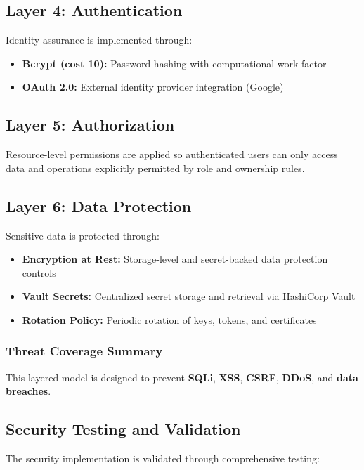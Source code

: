 \documentclass[11pt,a4paper]{report}
\begin{document}
\subsection{Layer 4: Authentication}

Identity assurance is implemented through:
\begin{itemize}
  \item \textbf{Bcrypt (cost 10):} Password hashing with computational work factor
  \item \textbf{OAuth 2.0:} External identity provider integration (Google)
\end{itemize}

\subsection{Layer 5: Authorization}

Resource-level permissions are applied so authenticated users can only access data and operations explicitly permitted by role and ownership rules.

\subsection{Layer 6: Data Protection}

Sensitive data is protected through:
\begin{itemize}
  \item \textbf{Encryption at Rest:} Storage-level and secret-backed data protection controls
  \item \textbf{Vault Secrets:} Centralized secret storage and retrieval via HashiCorp Vault
  \item \textbf{Rotation Policy:} Periodic rotation of keys, tokens, and certificates
\end{itemize}

\subsubsection{Threat Coverage Summary}
This layered model is designed to prevent \textbf{SQLi}, \textbf{XSS}, \textbf{CSRF}, \textbf{DDoS}, and \textbf{data breaches}.

\pagebreak

\subsection{Security Testing and Validation}

The security implementation is validated through comprehensive testing:
\end{document}
